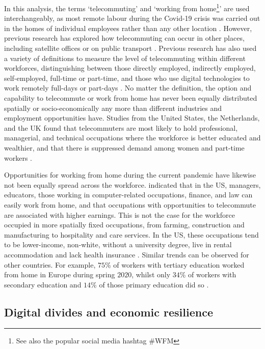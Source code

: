 \documentclass[Royal,times,sageh]{sagej}
\begin{document}
In this analysis, the terms `telecommuting' and `working from
home\footnote{See also the popular social media hashtag \#WFM}' are used
interchangeably, as most remote labour during the Covid-19 crisis was
carried out in the homes of individual employees rather than any other
location \citep{eurofound2020}. However, previous research has explored
how telecommuting can occur in other places, including satellite offices
or on public transport \citep{felstead2012rapid, siha2006telecommuting}.
Previous research has also used a variety of definitions to measure the
level of telecommuting within different workforces, distinguishing
between those directly employed, indirectly employed, self-employed,
full-time or part-time, and those who use digital technologies to work
remotely full-days or part-days
\citep{allen2015effective, bailey2002review, haddad2009examination}. No
matter the definition, the option and capability to telecommute or work
from home has never been equally distributed spatially or
socio-economically any more than different industries and employment
opportunities have. Studies from the United States, the Netherlands, and
the UK found that telecommuters are most likely to hold professional,
managerial, and technical occupations where the workforce is better
educated and wealthier, and that there is suppressed demand among women
and part-time workers
\citep{headicar2016move, peters2004employees, singh2013modeling}.

Opportunities for working from home during the current pandemic have
likewise not been equally spread across the workforce.
\citet{NBERw26948} indicated that in the US, managers, educators, those
working in computer-related occupations, finance, and law can easily
work from home, and that occupations with opportunities to telecommute
are associated with higher earnings. This is not the case for the
workforce occupied in more spatially fixed occupations, from farming,
construction and manufacturing to hospitality and care services. In the
US, these occupations tend to be lower-income, non-white, without a
university degree, live in rental accommodation and lack health
insurance \citep{NBERw27085}. Similar trends can be observed for other
countries. For example, \(75\)\% of workers with tertiary education
worked from home in Europe during spring \(2020\), whilst only \(34\)\%
of workers with secondary education and \(14\)\% of those primary
education did so \citep{eurofound2020}.

\hypertarget{sec:2.2}{%
\subsection{Digital divides and economic resilience}\label{sec:2.2}}
\end{document}
